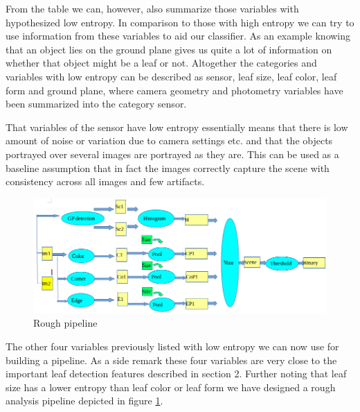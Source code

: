 \documentclass[fleqn,10pt]{SelfArx} %
\begin{document}
From the table we can, however, also summarize those variables with hypothesized low entropy. In comparison to those with high entropy we can try to use information from these variables to aid our classifier. As an example knowing that an object lies on the ground plane gives us quite a lot of information on whether that object might be a leaf or not. Altogether the categories and variables with low entropy can be described as sensor, leaf size, leaf color, leaf form and ground plane, where camera geometry and photometry variables have been summarized into the category sensor.

That variables of the sensor have low entropy essentially means that there is low amount of noise or variation due to camera settings etc. and that the objects portrayed over several images are portrayed as they are. This can be used as a baseline assumption that in fact the images correctly capture the scene with consistency across all images and few artifacts.

\begin{figure}[ht]\centering
\includegraphics[width=\linewidth]{Figures/PipelineDetail.png}
\caption{Rough pipeline}
\label{fig:Pipeline}
\end{figure}

The other four variables previously listed with low entropy we can now use for building a pipeline. As a side remark these four variables are very close to the important leaf detection features described in section 2. Further noting that leaf size has a lower entropy than leaf color or leaf form we have designed a rough analysis pipeline depicted in figure \ref{fig:Pipeline}. 

\end{document}
